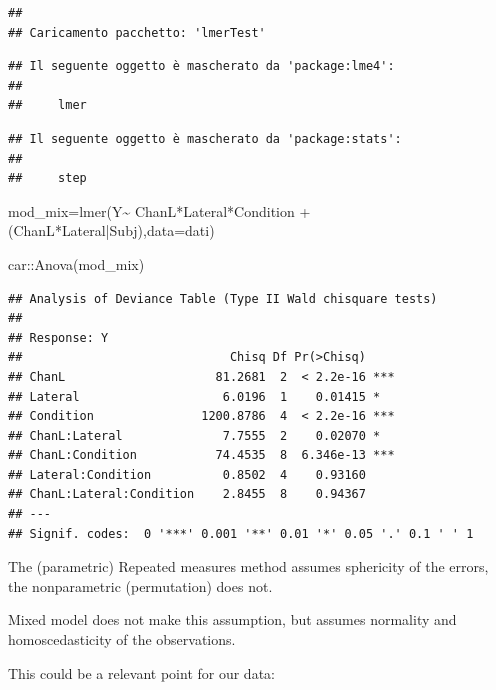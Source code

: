 \documentclass[
]{article}
\newenvironment{Shaded}{\begin{snugshade}}{\end{snugshade}}
\newcommand{\AttributeTok}[1]{\textcolor[rgb]{0.77,0.63,0.00}{#1}}
\newcommand{\FunctionTok}[1]{\textcolor[rgb]{0.00,0.00,0.00}{#1}}
\newcommand{\NormalTok}[1]{#1}
\newcommand{\OtherTok}[1]{\textcolor[rgb]{0.56,0.35,0.01}{#1}}
\newcommand{\SpecialCharTok}[1]{\textcolor[rgb]{0.00,0.00,0.00}{#1}}
\begin{document}
\begin{verbatim}
## 
## Caricamento pacchetto: 'lmerTest'
\end{verbatim}

\begin{verbatim}
## Il seguente oggetto è mascherato da 'package:lme4':
## 
##     lmer
\end{verbatim}

\begin{verbatim}
## Il seguente oggetto è mascherato da 'package:stats':
## 
##     step
\end{verbatim}

\begin{Shaded}
\begin{Highlighting}[]
\NormalTok{mod\_mix}\OtherTok{=}\FunctionTok{lmer}\NormalTok{(Y}\SpecialCharTok{\textasciitilde{}}\NormalTok{ ChanL}\SpecialCharTok{*}\NormalTok{Lateral}\SpecialCharTok{*}\NormalTok{Condition }\SpecialCharTok{+}\NormalTok{(ChanL}\SpecialCharTok{*}\NormalTok{Lateral}\SpecialCharTok{|}\NormalTok{Subj),}\AttributeTok{data=}\NormalTok{dati)}

\NormalTok{car}\SpecialCharTok{::}\FunctionTok{Anova}\NormalTok{(mod\_mix)}
\end{Highlighting}
\end{Shaded}

\begin{verbatim}
## Analysis of Deviance Table (Type II Wald chisquare tests)
## 
## Response: Y
##                             Chisq Df Pr(>Chisq)    
## ChanL                     81.2681  2  < 2.2e-16 ***
## Lateral                    6.0196  1    0.01415 *  
## Condition               1200.8786  4  < 2.2e-16 ***
## ChanL:Lateral              7.7555  2    0.02070 *  
## ChanL:Condition           74.4535  8  6.346e-13 ***
## Lateral:Condition          0.8502  4    0.93160    
## ChanL:Lateral:Condition    2.8455  8    0.94367    
## ---
## Signif. codes:  0 '***' 0.001 '**' 0.01 '*' 0.05 '.' 0.1 ' ' 1
\end{verbatim}

The (parametric) Repeated measures method assumes sphericity of the
errors, the nonparametric (permutation) does not.

Mixed model does not make this assumption, but assumes normality and
homoscedasticity of the observations.

This could be a relevant point for our data:

\begin{Shaded}
\end{Shaded}
\end{document}

